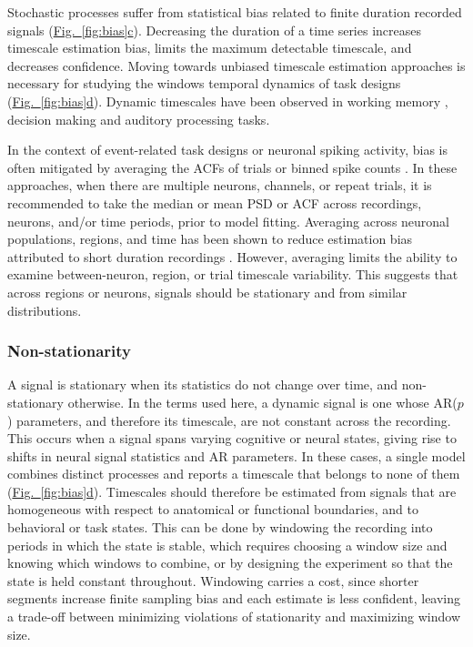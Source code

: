 \documentclass[pdflatex,sn-mathphys-num]{sn-jnl}
\newcommand{\figpanel}[2]{\hyperref[#1]{Fig.~\ref*{#1}#2}}
\begin{document}
Stochastic processes suffer from statistical bias related to finite duration recorded signals (\figpanel{fig:bias}{c}). Decreasing the duration of a time series increases timescale estimation bias, limits the maximum detectable timescale, and decreases confidence. Moving towards unbiased timescale estimation approaches is necessary for studying the windows temporal dynamics of task designs (\figpanel{fig:bias}{d}). Dynamic timescales have been observed in working memory \cite{wasmuht_intrinsic_2018, gao_neuronal_2020}, decision making \cite{ganupuru_flexibility_2019} and auditory processing \cite{chien_constructing_2020} tasks.

In the context of event-related task designs or neuronal spiking activity, bias is often mitigated by averaging the ACFs of trials or binned spike counts \cite{murray_hierarchy_2014}. In these approaches, when there are multiple neurons, channels, or repeat trials, it is recommended to take the median or mean PSD or ACF across recordings, neurons, and/or time periods, prior to model fitting. Averaging across neuronal populations, regions, and time has been shown to reduce estimation bias attributed to short duration recordings \cite{spitzner_mr_2021}. However, averaging limits the ability to examine between-neuron, region, or trial timescale variability. This suggests that across regions or neurons, signals should be stationary and from similar distributions.

\subsubsection{Non-stationarity}

A signal is stationary when its statistics do not change over time, and non-stationary otherwise. In the terms used here, a dynamic signal is one whose AR($p$) parameters, and therefore its timescale, are not constant across the recording. This occurs when a signal spans varying cognitive or neural states, giving rise to shifts in neural signal statistics and AR parameters. In these cases, a single model combines distinct processes and reports a timescale that belongs to none of them (\figpanel{fig:bias}{d}). Timescales should therefore be estimated from signals that are homogeneous with respect to anatomical or functional boundaries, and to behavioral or task states. This can be done by windowing the recording into periods in which the state is stable, which requires choosing a window size and knowing which windows to combine, or by designing the experiment so that the state is held constant throughout. Windowing carries a cost, since shorter segments increase finite sampling bias and each estimate is less confident, leaving a trade-off between minimizing violations of stationarity and maximizing window size.
\end{document}

